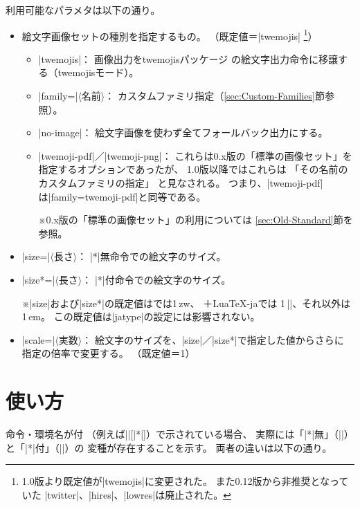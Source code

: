 \documentclass[a4paper]{ltjsarticle}
\renewcommand{\headfont}{\romanseries{sbc}\sffamily}
\newcommand{\Pkg}[1]{\textsf{#1}}
\newcommand{\Meta}[1]{$\langle$\mbox{}#1\mbox{}$\rangle$}
\newcommand{\Note}{\par\noindent ※}
\newcommand{\Means}{：\quad}
\newcommand{\／}{\mbox{}／\mbox{}}
\newcommand{\EG}{\eghostguarded}
\providecommand{\Strong}[1]{{\headfont#1}}
\begin{document}
利用可能なパラメタは以下の通り。

\begin{itemize}
\item \Strong{絵文字画像セット}の種別を指定するもの。
  （既定値＝|twemojis|%
  \footnote{1.0版より既定値が|twemojis|に変更された。
    また0.12版から非推奨となっていた
    |twitter|、|hires|、|lowres|は\Strong{廃止}された。}）
  \begin{itemize}
  \item |twemojis|\Means
    画像出力を\Pkg{twemojis}パッケージ
    の絵文字出力命令に移譲する（twemojisモード）。
  \item |family=|\Meta{名前}\Means
    カスタムファミリ指定（\ref{sec:Custom-Families}節参照）。
  \item |no-image|\Means
    絵文字画像を使わず全てフォールバック出力にする。
  \item |twemoji-pdf|\／|twemoji-png|\Means
    これらは0.x版の「標準の画像セット」を指定するオプションであったが、
    1.0版以降ではこれらは
    「その名前のカスタムファミリの指定」
    と見なされる。
    つまり、|twemoji-pdf|は|family=twemoji-pdf|と同等である。
    \Note 0.x版の「標準の画像セット」の利用については
    \ref{sec:Old-Standard}節を参照。
  \end{itemize}

\item |size=|\Meta{長さ}\Means
  |*|無命令での絵文字のサイズ。
\item |size*=|\Meta{長さ}\Means
  |*|付命令での絵文字のサイズ。
  \Note |size|および|size*|の既定値は\EG{(u)\pLaTeX}では1\,zw、
  {\LuaLaTeX}＋\Pkg{LuaTeX-ja}では 1\,|\zw|、それ以外は1\,em。
  この既定値は|jatype|の設定には影響されない。

\item |scale=|\Meta{実数}\Means
  絵文字のサイズを、|size|\／|size*|で指定した値からさらに
  指定の倍率で変更する。
  （既定値＝1）
\end{itemize}


\section{使い方}
\label{sec:Usage}

命令・環境名が\EG{[|*|]}付
（例えば||[|*|]）で示されている場合、
実際には「|*|無」（||）と「|*|付」（||）の
変種が存在することを示す。
両者の違いは以下の通り。
\end{document}
